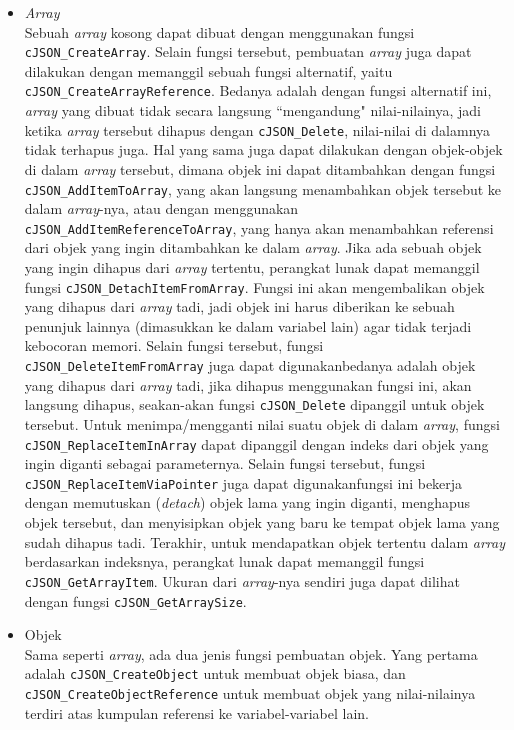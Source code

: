 \documentclass[a4paper,twoside]{article}
\begin{document}
\begin{enumerate}
\begin{itemize}
	\item \textit{Array}\\
	Sebuah \textit{array} kosong dapat dibuat dengan menggunakan fungsi \verb|cJSON_CreateArray|. Selain fungsi tersebut, pembuatan \textit{array} juga dapat dilakukan dengan memanggil sebuah fungsi alternatif, yaitu \verb|cJSON_CreateArrayReference|. Bedanya adalah dengan fungsi alternatif ini, \textit{array} yang dibuat tidak secara langsung ``mengandung" nilai-nilainya, jadi ketika \textit{array} tersebut dihapus dengan \verb|cJSON_Delete|, nilai-nilai di dalamnya tidak terhapus juga. Hal yang sama juga dapat dilakukan dengan objek-objek di dalam \textit{array} tersebut, dimana objek ini dapat ditambahkan dengan fungsi \verb|cJSON_AddItemToArray|, yang akan langsung menambahkan objek tersebut ke dalam \textit{array}-nya, atau dengan menggunakan \verb|cJSON_AddItemReferenceToArray|, yang hanya akan menambahkan referensi dari objek yang ingin ditambahkan ke dalam \textit{array}.
	Jika ada sebuah objek yang ingin dihapus dari \textit{array} tertentu, perangkat lunak dapat memanggil fungsi \verb|cJSON_DetachItemFromArray|. Fungsi ini akan mengembalikan objek yang dihapus dari \textit{array} tadi, jadi objek ini harus diberikan ke sebuah penunjuk lainnya (dimasukkan ke dalam variabel lain) agar tidak terjadi kebocoran memori. Selain fungsi tersebut, fungsi \verb|cJSON_DeleteItemFromArray| juga dapat digunakan\textemdash bedanya adalah objek yang dihapus dari \textit{array} tadi, jika dihapus menggunakan fungsi ini, akan langsung dihapus, seakan-akan fungsi \verb|cJSON_Delete| dipanggil untuk objek tersebut.
	Untuk menimpa/mengganti nilai suatu objek di dalam \textit{array}, fungsi \verb|cJSON_ReplaceItemIn|\linebreak \verb|Array| dapat dipanggil dengan indeks dari objek yang ingin diganti sebagai parameternya. Selain fungsi tersebut, fungsi \verb|cJSON_ReplaceItemViaPointer| juga dapat digunakan\textemdash fungsi ini bekerja dengan memutuskan (\textit{detach}) objek lama yang ingin diganti, menghapus objek tersebut, dan menyisipkan objek yang baru ke tempat objek lama yang sudah dihapus tadi.
	Terakhir, untuk mendapatkan objek tertentu dalam \textit{array} berdasarkan indeksnya, perangkat lunak dapat memanggil fungsi \verb|cJSON_GetArrayItem|. Ukuran dari \textit{array}-nya sendiri juga dapat dilihat dengan fungsi \verb|cJSON_GetArraySize|.
	\item Objek\\	
	Sama seperti \textit{array}, ada dua jenis fungsi pembuatan objek. Yang pertama adalah \verb|cJSON_CreateObject| untuk membuat objek biasa, dan \verb|cJSON_CreateObjectReference| untuk membuat objek yang nilai-nilainya terdiri atas kumpulan referensi ke variabel-variabel lain.

\end{itemize}
\end{enumerate}
\end{document}
